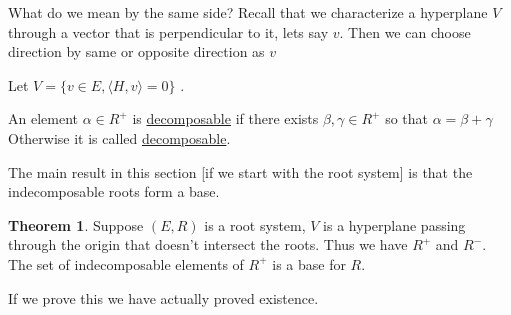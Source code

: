 \documentclass{article}
\theoremstyle{definition}
\newtheorem{theorem}{Theorem}
\begin{document}
What do we mean by the same side? Recall that we characterize a hyperplane \(V\) through a vector that is perpendicular to it, lets say \(v\). Then we can choose direction by same or opposite direction as \(v\) 

Let \(V = \{ v\in E, \langle H,v \rangle =0 \} \) .

An element \(\alpha \in R^+\) is \underline{decomposable} if there exists \(\beta ,\gamma \in R^+\) so that \(\alpha = \beta +\gamma\) Otherwise it is called \underline{decomposable}.

The main result in this section [if we start with the root system] is that the indecomposable roots form a base.

\begin{theorem}
    Suppose \((E,R)\) is a root system, \(V\) is a hyperplane passing through the origin that doesn't intersect the roots. Thus we have \(R^+\) and \(R^-\). The set of indecomposable elements of \(R^+\) is a base for \(R\). 
\end{theorem}

If we prove this we have actually proved existence.
\end{document}
